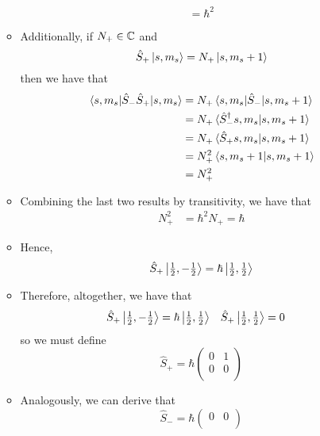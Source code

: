 \documentclass[../notes.tex]{subfiles}
\begin{document}
\begin{itemize}
\begin{itemize}
\begin{equation*}
            = \hbar^2
        \end{equation*}
        \item Additionally, if $N_+\in\mathbb{C}$ and
        \begin{equation*}
            \hat{S}_+\ket{s,m_s} = N_+\ket{s,m_s+1}
        \end{equation*}
        then we have that
        \begin{align*}
            \ev{\hat{S}_-\hat{S}_+}{s,m_s} &= N_+\mel{s,m_s}{\hat{S}_-}{s,m_s+1}\\
            &= N_+\braket*{\hat{S}_-^\dagger s,m_s}{s,m_s+1}\\
            &= N_+\braket*{\hat{S}_+s,m_s}{s,m_s+1}\\
            &= N_+^2\braket{s,m_s+1}\\
            &= N_+^2
        \end{align*}
        \item Combining the last two results by transitivity, we have that
        \begin{align*}
            N_+^2 &= \hbar^2
            N_+ = \hbar
        \end{align*}
        \item Hence,
        \begin{equation*}
            \hat{S}_+\ket{\tfrac{1}{2},-\tfrac{1}{2}} = \hbar\ket{\tfrac{1}{2},\tfrac{1}{2}}
        \end{equation*}
        \item Therefore, altogether, we have that
        \begin{align*}
            \hat{S}_+\ket{\tfrac{1}{2},-\tfrac{1}{2}} &= \hbar\ket{\tfrac{1}{2},\tfrac{1}{2}}&
            \hat{S}_+\ket{\tfrac{1}{2},\tfrac{1}{2}} &= 0
        \end{align*}
        so we must define
        \begin{equation*}
            \hat{S}_+ = \hbar
            \begin{pmatrix}
                0 & 1\\
                0 & 0\\
            \end{pmatrix}
        \end{equation*}
        \item Analogously, we can derive that
        \begin{equation*}
            \hat{S}_- = \hbar
            \begin{pmatrix}
                0 & 0\\

\end{pmatrix}
\end{equation*}
\end{itemize}
\end{itemize}
\end{document}
